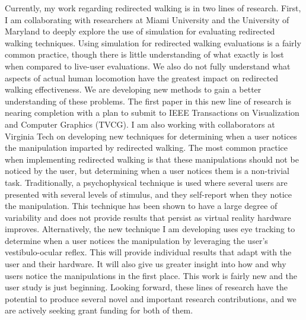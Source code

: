 Currently, my work regarding redirected walking is in two lines of research. First, I am collaborating with researchers at Miami University and the University of Maryland to deeply explore the use of simulation for evaluating redirected walking techniques. Using simulation for redirected walking evaluations is a fairly common practice, though there is little understanding of what exactly is lost when compared to live-user evaluations. We also do not fully understand what aspects of actual human locomotion have the greatest impact on redirected walking effectiveness. We are developing new methods to gain a better understanding of these problems. The first paper in this new line of research is nearing completion with a plan to submit to IEEE Transactions on Visualization and Computer Graphics (TVCG). I am also working with collaborators at Virginia Tech on developing new techniques for determining when a user notices the manipulation imparted by redirected walking. The most common practice when implementing redirected walking is that these manipulations should not be noticed by the user, but determining when a user notices them is a non-trivial task. Traditionally, a psychophysical technique is used where several users are presented with several levels of stimulus, and they self-report when they notice the manipulation. This technique has been shown to have a large degree of variability and does not provide results that persist as virtual reality hardware improves. Alternatively, the new technique I am developing uses eye tracking to determine when a user notices the manipulation by leveraging the user's vestibulo-ocular reflex. This will provide individual results that adapt with the user and their hardware. It will also give us greater insight into how and why users notice the manipulations in the first place. This work is fairly new and the user study is just beginning. Looking forward, these lines of research have the potential to produce several novel and important research contributions, and we are actively seeking grant funding for both of them. 

